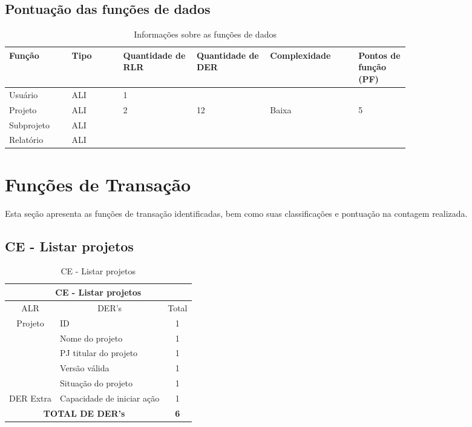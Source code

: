   \subsection{Pontuação das funções de dados}
  
      \begin{table*}[!h]
      \centering
      \caption{Informações sobre as funções de dados}
      \label{funcoes_dados}
	\begin{tabular}{|p{0.12\linewidth}|p{0.10\linewidth}|p{0.14\linewidth}|p{0.14\linewidth}|p{0.17\linewidth}|p{0.10\linewidth}|}
	\hline
	\textbf{Função} & \textbf{Tipo} & \textbf{Quantidade de RLR} & \textbf{Quantidade de DER} & \textbf{Complexidade} & \textbf{Pontos de função (PF)} \\
	  \hline
	Usuário & ALI & 1 &  &  & \\
	\hline
	Projeto & ALI & 2 & 12 & Baixa & 5 \\
	\hline
	Subprojeto & ALI & &  & & \\
	\hline
	Relatório & ALI & &  & & \\
	\hline
	\end{tabular}
      \end{table*}

\vfill
\pagebreak
\section{Funções de Transação}
  
  Esta seção apresenta as funções de transação identificadas, bem como suas classificações e pontuação na contagem realizada.
  
  \subsection{CE - Listar projetos}

\begin{table}[!h]
\centering
\caption{CE - Listar projetos}
\label{ce_listar_projeto}
\begin{tabular}{|c|l|c|}
\hline
\multicolumn{3}{|c|}{CE - Listar projetos}                    \\ \hline
ALR                      & \multicolumn{1}{c|}{DER's} & Total \\ \hline
\multirow{5}{*}{Projeto} & ID                         & 1     \\ \cline{2-3} 
                         & Nome do projeto            & 1     \\ \cline{2-3} 
                         & PJ titular do projeto      & 1     \\ \cline{2-3} 
                         & Versão válida              & 1     \\ \cline{2-3} 
                         & Situação do projeto        & 1     \\ \hline
DER Extra                & Capacidade de iniciar ação & 1     \\ \hline
\multicolumn{2}{|c|}{\textbf{TOTAL DE DER's}}                  & \textbf{6}     \\ \hline
\end{tabular}
\end{table}

